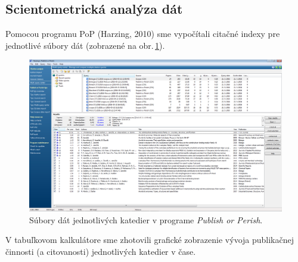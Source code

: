 \subsection{Scientometrická analýza dát}

Pomocou programu PoP (Harzing, 2010) sme vypočítali citačné indexy pre
jednotlivé súbory dát (zobrazené na obr.\,\ref{fig:pop.departmentfiles}).

\begin{figure}
  \centering
  \includegraphics[width=\textwidth]{obr/publish-or-perish.jpg}
  \caption{Súbory dát jednotlivých katedier v programe \emph{Publish or Perish}.}
  \label{fig:pop.departmentfiles}
\end{figure}

V tabuľkovom kalkulátore sme zhotovili grafické zobrazenie vývoja publikačnej
činnosti (a citovanosti) jednotlivých katedier v čase.


